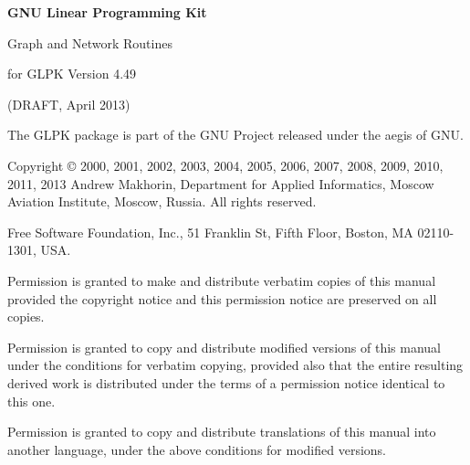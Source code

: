 \documentclass[11pt]{report}
\begin{document}
\thispagestyle{empty}

\begin{center}

\vspace*{1.5in}

\begin{huge}
\sf\bfseries GNU Linear Programming Kit
\end{huge}

\vspace{0.5in}

\begin{LARGE}
\sf Graph and Network Routines
\end{LARGE}

\vspace{0.5in}

\begin{LARGE}
\sf for GLPK Version 4.49
\end{LARGE}

\vspace{0.5in}
\begin{Large}
\sf (DRAFT, April 2013)
\end{Large}
\end{center}

\newpage

\vspace*{1in}

\vfill

\noindent
The GLPK package is part of the GNU Project released under the aegis of
GNU.

\noindent
Copyright \copyright{} 2000, 2001, 2002, 2003, 2004, 2005, 2006, 2007,
2008, 2009, 2010, 2011, 2013 Andrew Makhorin, Department for Applied
Informatics, Moscow Aviation Institute, Moscow, Russia. All rights
reserved.

\noindent
Free Software Foundation, Inc., 51 Franklin St, Fifth Floor, Boston, MA
02110-1301, USA.

\noindent
Permission is granted to make and distribute verbatim copies of this
manual provided the copyright notice and this permission notice are
preserved on all copies.

\noindent
Permission is granted to copy and distribute modified versions of this
manual under the conditions for verbatim copying, provided also that the
entire resulting derived work is distributed under the terms of
a permission notice identical to this one.

\noindent
Permission is granted to copy and distribute translations of this manual
into another language, under the above conditions for modified versions.
\end{document}
